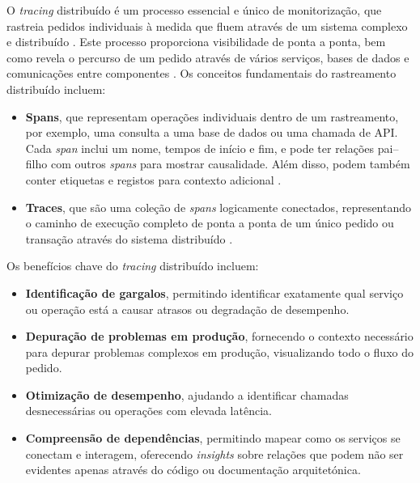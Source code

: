 O \textit{tracing} distribuído é um processo essencial e único de monitorização, que rastreia pedidos individuais à medida que fluem através de um sistema complexo e distribuído \cite{Sambasivan2014}. Este processo proporciona visibilidade de ponta a ponta, bem como revela o percurso de um pedido através de vários serviços, bases de dados e comunicações entre componentes \cite{Zhang2023}. Os conceitos fundamentais do rastreamento distribuído incluem:

\begin{itemize}
    \item \textbf{Spans}, que representam operações individuais dentro de um rastreamento, por exemplo, uma consulta a uma base de dados ou uma chamada de API. Cada \textit{span} inclui um nome, tempos de início e fim, e pode ter relações pai--filho com outros \textit{spans} para mostrar causalidade. Além disso, podem também conter etiquetas e registos para contexto adicional \cite{Sambasivan2014}.

    \item \textbf{Traces}, que são uma coleção de \textit{spans} logicamente conectados, representando o caminho de execução completo de ponta a ponta de um único pedido ou transação através do sistema distribuído \cite{Sambasivan2014}.
\end{itemize}

Os benefícios chave do \textit{tracing} distribuído incluem:

\begin{itemize}
    \item \textbf{Identificação de gargalos}, permitindo identificar exatamente qual serviço ou operação está a causar atrasos ou degradação de desempenho.

    \item \textbf{Depuração de problemas em produção}, fornecendo o contexto necessário para depurar problemas complexos em produção, visualizando todo o fluxo do pedido.

    \item \textbf{Otimização de desempenho}, ajudando a identificar chamadas desnecessárias ou operações com elevada latência.

    \item \textbf{Compreensão de dependências}, permitindo mapear como os serviços se conectam e interagem, oferecendo \textit{insights} sobre relações que podem não ser evidentes apenas através do código ou documentação arquitetónica.
\end{itemize}

